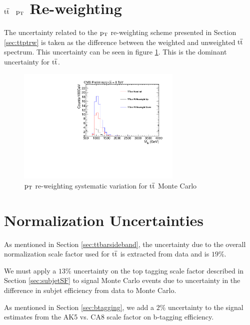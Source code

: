 \section{$\mathrm{t\overline{t}}$ $\mathrm{p_{T}}$ Re-weighting}
The uncertainty related to the $\mathrm{p_{T}}$ re-weighting scheme presented in Section \ref{sec:ttptrw} is taken as the difference between the weighted and unweighted $\mathrm{t\overline{t}}$ spectrum.
This uncertainty can be seen in figure \ref{figs:ptreweight}.  This is the dominant uncertainty for $\mathrm{t\overline{t}}$. 

\begin{figure}[htcb]
\begin{center}
\includegraphics[width=0.7\textwidth]{AN-13-004/figs/TTbar_PTReweighting}
\caption{
$\mathrm{p_{T}}$ re-weighting systematic variation for $\mathrm{t\overline{t}}$ Monte Carlo 
}
\label{figs:ptreweight}
\end{center}
\end{figure}

\section{Normalization Uncertainties}
As mentioned in Section \ref{sec:ttbarsideband}, the uncertainty due to the overall normalization scale factor used for $\mathrm{t\overline{t}}$ is extracted from data and is $19\%$.   

We must apply a $13\%$ uncertainty on the top tagging scale factor described in Section \ref{sec:subjetSF} to signal Monte Carlo events due to uncertainty in the difference in subjet efficiency from data to Monte Carlo.

As mentioned in Section \ref{sec:btagging}, we add a $2\%$ uncertainty to the signal estimates from the AK5 vs. CA8 scale factor on b-tagging efficiency. 

